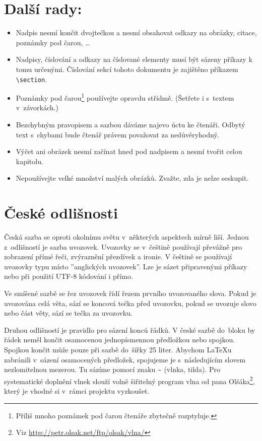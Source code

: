 \documentclass[10pt,a4paper, twocolumn]{article}
\begin{document}
\section{Další rady:}\label{sec:Další rady:}
\begin{itemize}
\item Nadpis nesmí končit dvojtečkou a nesmí obsahovat odkazy na obrázky, citace, poznámky pod čarou, \dots
\item Nadpisy, číslování a odkazy na číslované elementy musí být sázeny příkazy k tomu určenými.
Číslování sekcí tohoto dokumentu je zajištěno příkazem \verb|\section|.
\item Poznámky pod čarou\footnote[1]{Příliš mnoho poznámek pod čarou čtenáře zbytečně rozptyluje.} používejte opravdu střídmě.
(Šetřete i s~textem v~závorkách.)
\item Bezchybným pravopisem a sazbou dáváme najevo úctu ke čtenáři.
Odbytý text s~chybami bude čtenář právem považovat za nedůvěryhodný.
\item Výčet ani obrázek nesmí začínat hned pod nadpisem a nesmí tvořit celou kapitolu.
\item Nepoužívejte velké množství malých obrázků.
Zvažte, zda je nelze seskupit.
\end{itemize}

\section{České odlišnosti}\label{sec:České odlišnosti}
Česká sazba se oproti okolnímu světu v~některých aspektech mírně liší.
Jednou z~odlišností je sazba uvozovek.
Uvozovky se v~češtině používají převážně pro zobrazení přímé řeči, zvýraznění přezdívek a ironie.
V češtině se používají uvozovky typu  místo ''anglických uvozovek''.
Lze je sázet připravenými příkazy nebo při použití UTF-8 kódování i přímo.

Ve smíšené sazbě se řez uvozovek řídí řezem prvního uvozovaného slova.
Pokud je uvozována celá věta, sází se koncová tečka před uvozovku, pokud se uvozuje slovo nebo část věty, sází se tečka za uvozovku.

Druhou odlišností je pravidlo pro sázení konců řádků.
V české sazbě do~bloku by řádek neměl končit osamocenou jednopísmennou předložkou nebo spojkou.
Spojkou  končit může pouze při sazbě do~šířky 25 liter.
Abychom \LaTeX u zabránili v~sázení osamocených předložek, spojujeme je s~následujícím slovem nezlomitelnou mezerou.
Tu sázíme pomocí znaku \~{} (vlnka, tilda).
Pro systematické doplnění vlnek slouží volně šiřitelný program vlna od pana Olšáka\footnote[2]{Viz  \url{http://petr.olsak.net/ftp/olsak/vlna/}}, který je vhodné si v~rámci projektu vyzkoušet.
\end{document}
